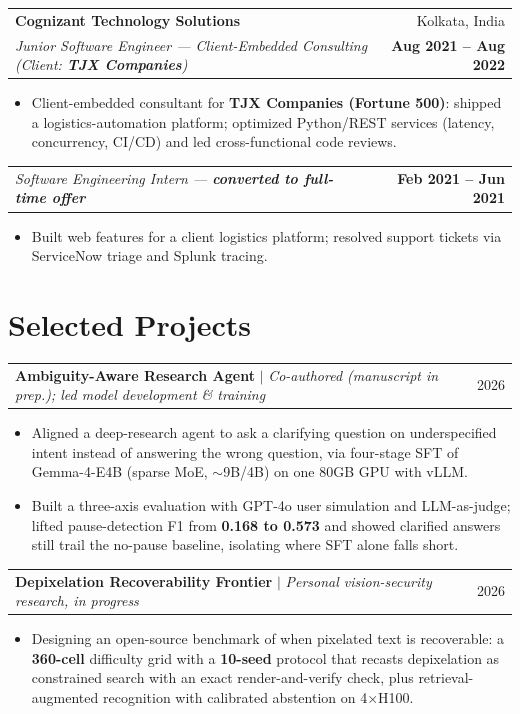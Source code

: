\documentclass[letterpaper,11pt]{article}
\makeatletter
\newcommand{\entry}[4]{%
  \vspace{2pt}%
  \begin{tabular*}{\textwidth}{@{}l@{\extracolsep{\fill}}r@{}}
    \textbf{#1} & #2 \\
    \textit{\small #3} & \textbf{\small #4} \\
  \end{tabular*}\par\vspace{-1pt}%
}
\newcommand{\subentry}[2]{%
  \vspace{2pt}%
  \begin{tabular*}{\textwidth}{@{}l@{\extracolsep{\fill}}r@{}}
    \textit{\small #1} & \textbf{\small #2} \\
  \end{tabular*}\par\vspace{-1pt}%
}
\newcommand{\heading}[2]{%
  \vspace{2pt}%
  \begin{tabularx}{\textwidth}{@{}>{\raggedright\arraybackslash\small}X@{\hspace{1em}}>{\small}r@{}}
    #1 & #2 \\
  \end{tabularx}\par\vspace{-1pt}%
}
\makeatother
\begin{document}
\entry
  {Cognizant Technology Solutions}{Kolkata, India}
  {Junior Software Engineer --- Client-Embedded Consulting (Client: \textbf{TJX Companies})}{Aug 2021 -- Aug 2022}
\begin{itemize}\small
  \item Client-embedded consultant for \textbf{TJX Companies (Fortune 500)}: shipped a logistics-automation platform; optimized Python/REST services (latency, concurrency, CI/CD) and led cross-functional code reviews.
\end{itemize}
\subentry
  {Software Engineering Intern --- \textbf{converted to full-time offer}}{Feb 2021 -- Jun 2021}
\begin{itemize}\small
  \item Built web features for a client logistics platform; resolved support tickets via ServiceNow triage and Splunk tracing.
\end{itemize}

\section{Selected Projects}

\heading
  {\textbf{Ambiguity-Aware Research Agent} $|$ \textit{Co-authored (manuscript in prep.); led model development \& training}}{2026}
\begin{itemize}\small
  \item Aligned a deep-research agent to ask a clarifying question on underspecified intent instead of answering the wrong question, via four-stage SFT of Gemma-4-E4B (sparse MoE, $\sim$9B/4B) on one 80GB GPU with vLLM.
  \item Built a three-axis evaluation with GPT-4o user simulation and LLM-as-judge; lifted pause-detection F1 from \textbf{0.168 to 0.573} and showed clarified answers still trail the no-pause baseline, isolating where SFT alone falls short.
\end{itemize}

\heading
  {\textbf{Depixelation Recoverability Frontier} $|$ \textit{Personal vision-security research, in progress}}{2026}
\begin{itemize}\small
  \item Designing an open-source benchmark of when pixelated text is recoverable: a \textbf{360-cell} difficulty grid with a \textbf{10-seed} protocol that recasts depixelation as constrained search with an exact render-and-verify check, plus retrieval-augmented recognition with calibrated abstention on 4$\times$H100.
\end{itemize}
\end{document}
